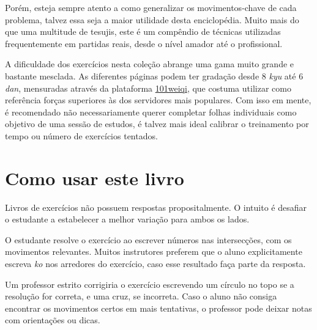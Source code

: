 Porém, esteja sempre atento a como generalizar os movimentos-chave de cada problema, talvez essa seja a maior utilidade desta enciclopédia. Muito mais do que uma multitude de tesujis, este é um compêndio de técnicas utilizadas frequentemente em partidas reais, desde o nível amador até o profissional.

A dificuldade dos exercícios nesta coleção abrange uma gama muito grande e bastante mesclada. As diferentes páginas podem ter gradação desde 8 \textit{kyu} até 6 \textit{dan}, mensuradas através da plataforma \href{https://www.101weiqi.com/}{101weiqi}, que costuma utilizar como referência forças superiores às dos servidores mais populares. Com isso em mente, é recomendado não necessariamente querer completar folhas individuais como objetivo de uma sessão de estudos, é talvez mais ideal calibrar o treinamento por tempo ou número de exercícios tentados.
 
\section*{Como usar este livro}
{}

Livros de exercícios não possuem respostas propositalmente. O intuito é desafiar o estudante a estabelecer a melhor variação para ambos os lados.

O estudante resolve o exercício ao escrever números nas intersecções, com os movimentos relevantes. Muitos instrutores preferem que o aluno explicitamente escreva \textit{ko} nos arredores do exercício, caso esse resultado faça parte da resposta. 

Um professor estrito corrigiria o exercício escrevendo um círculo no topo se a resolução for correta, e uma cruz, se incorreta. Caso o aluno não consiga encontrar os movimentos certos em mais tentativas, o professor pode deixar notas com orientações ou dicas.

\vspace{0.9cm}

\fontsize{14}{14}\selectfont

